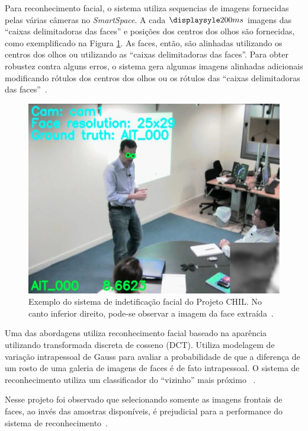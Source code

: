 Para reconhecimento facial, o sistema utiliza sequencias de imagens fornecidas pelas várias câmeras no \textit{SmartSpace}. A cada $\displaysyle 200ms$ imagens das ``caixas delimitadoras das faces'' e posições dos centros dos olhos são fornecidas, como exemplificado na Figura \ref{chil}. As faces, então, são alinhadas utilizando os centros dos olhos ou utilizando as ``caixas delimitadoras das faces''. Para obter robustez contra alguns erros, o sistema gera algumas imagens alinhadas adicionais modificando rótulos dos centros dos olhos ou os rótulos das ``caixas delimitadoras das faces''~\cite{chil}.

	\begin{figure}[hbt]
		\begin{center}
			\includegraphics[scale=0.4]{figuras/3.TrabalhosCorrelatos/chil.png}
		\end{center}
		\caption{Exemplo do sistema de indetificação facial do Projeto CHIL. No canto inferior direito, pode-se observar a imagem da face extraída~\cite{chil}.}
		\label{chil}
	\end{figure}

Uma das abordagens utiliza reconhecimento facial baseado na aparência utilizando transformada discreta de cosseno (DCT). Utiliza modelagem de variação intrapessoal de Gauss para avaliar a probabilidade de que a diferença de um rosto de uma galeria de imagens de faces é de fato intrapessoal. O sistema de reconhecimento utiliza um classificador do ``vizinho'' mais próximo ~\cite{chil}.

Nesse projeto foi observado que selecionando somente as imagens frontais de faces, ao invés das amostras disponíveis, é prejudicial para a performance do sistema de reconhecimento~\cite{chil}.


